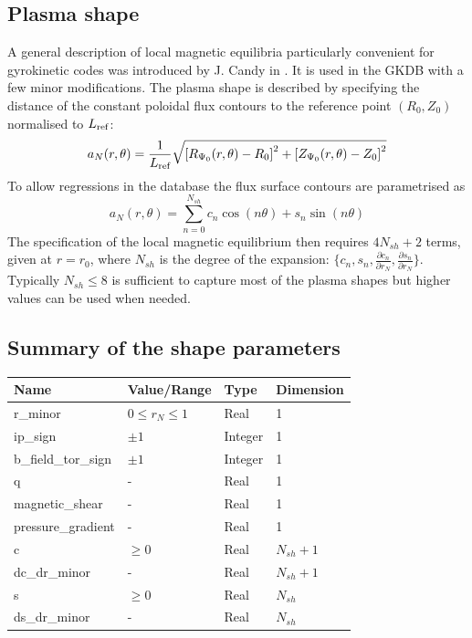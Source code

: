 \documentclass[a4paper]{report}
\begin{document}
\subsection{Plasma shape}
A general description of local magnetic equilibria particularly convenient for gyrokinetic codes was introduced by J. Candy in \cite {Candy:PPCF2009}. It is used in the GKDB with a few minor modifications.
The plasma shape is described by specifying the distance of the constant poloidal flux contours to the reference point $(R_0,Z_0)$  normalised to $L_{\textrm{ref}}$:
$$ a_N(r,\theta) = \frac{1}{L_{\textrm{ref}}}\sqrt{\left[R_{\Psi_0}(r,\theta)-R_0\right]^2 + \left[Z_{\Psi_0}(r,\theta)-Z_0\right]^2} $$
To allow regressions in the database the flux surface contours are parametrised as 
$$ a_N(r,\theta) = \sum_{n=0}^{N_{sh}} c_n \cos(n\theta) + s_n \sin(n\theta) $$
The specification of the local magnetic equilibrium then requires $4N_{sh}+2$ terms, given at $r=r_0$, where $N_{sh}$ is the degree of the expansion: $\{c_n,s_n,\frac{\partial c_n}{\partial r_N},\frac{\partial s_n}{\partial r_N}\}$. Typically $N_{sh}\leq8$ is sufficient to capture most of the plasma shapes but higher values can be used when needed.

\subsection{Summary of the shape parameters}
\begin{tabularx}{\textwidth}{|X|Y|Y|Y|}
\hline
Name & Value/Range & Type & Dimension \\
\hline
r\_minor & $0\leq r_N \leq 1$ & Real & 1 \\
ip\_sign & $\pm 1$ & Integer & 1 \\
b\_field\_tor\_sign & $\pm 1$ & Integer & 1 \\
q & - & Real & 1 \\
magnetic\_shear & - & Real & 1 \\
pressure\_gradient & - & Real & 1 \\
c & $\geq 0$ & Real & $N_{sh}+1$ \\
dc\_dr\_minor & - & Real & $N_{sh}+1$ \\
s & $\geq 0$ & Real & $N_{sh}$ \\
ds\_dr\_minor & - & Real & $N_{sh}$ \\
\hline
\end{tabularx}
\end{document}
